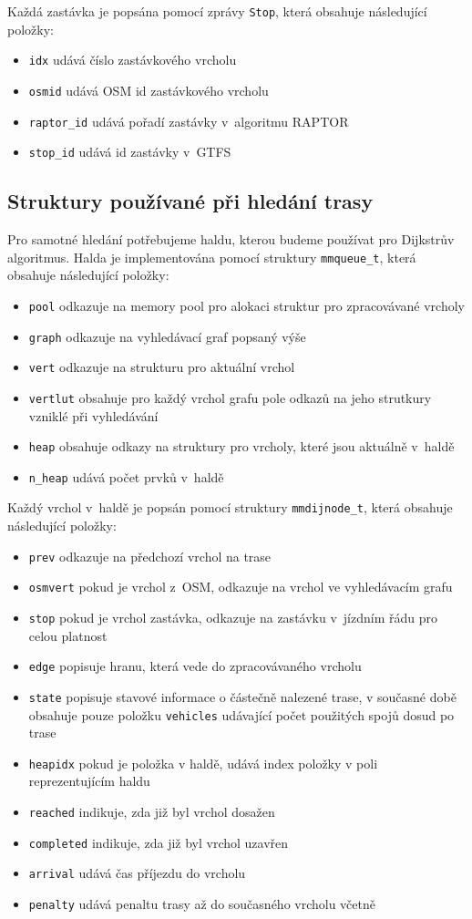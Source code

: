 Každá zastávka je popsána pomocí zprávy {\tt Stop}, která obsahuje následující
položky:
\begin{itemize}
	\item {\tt idx} udává číslo zastávkového vrcholu
	\item {\tt osmid} udává OSM id zastávkového vrcholu 
	\item {\tt raptor\_id} udává pořadí zastávky v~algoritmu RAPTOR
	\item {\tt stop\_id} udává id zastávky v~GTFS
\end{itemize} 

\subsection{Struktury používané při hledání trasy}
Pro samotné hledání potřebujeme haldu, kterou budeme používat pro Dijkstrův
algoritmus. Halda je implementována pomocí struktury {\tt mmqueue\_t}, která
obsahuje následující položky:
\begin{itemize}
	\item {\tt pool} odkazuje na memory pool pro alokaci struktur pro
		zpracovávané vrcholy 
	\item {\tt graph} odkazuje na vyhledávací graf popsaný výše
	\item {\tt vert} odkazuje na strukturu pro aktuální vrchol 
	\item {\tt vertlut} obsahuje pro každý vrchol grafu pole odkazů na
	jeho strutkury vzniklé při vyhledávání
	\item {\tt heap} obsahuje odkazy na struktury pro vrcholy, které jsou
		aktuálně v~haldě
	\item {\tt n\_heap} udává počet prvků v~haldě
\end{itemize}
Každý vrchol v~haldě je popsán pomocí struktury {\tt mmdijnode\_t}, která
obsahuje následující položky:
\begin{itemize}
	\item {\tt prev} odkazuje na předchozí vrchol na trase
	\item {\tt osmvert} pokud je vrchol z~OSM, odkazuje na vrchol ve
	vyhledávacím grafu 
	\item {\tt stop} pokud je vrchol zastávka, odkazuje na zastávku
v~jízdním řádu pro celou platnost
	\item {\tt edge} popisuje hranu, která vede do zpracovávaného vrcholu 
	\item {\tt state} popisuje stavové informace o částečně nalezené trase,
	v současné době obsahuje pouze položku {\tt vehicles} udávající počet
	použitých spojů dosud po trase
	\item {\tt heapidx} pokud je položka v haldě, udává index položky v poli
	reprezentujícím haldu
	\item {\tt reached} indikuje, zda již byl vrchol dosažen
	\item {\tt completed} indikuje, zda již byl vrchol uzavřen
	\item {\tt arrival} udává čas příjezdu do vrcholu
	\item {\tt penalty} udává penaltu trasy až do současného vrcholu včetně
\end{itemize}
